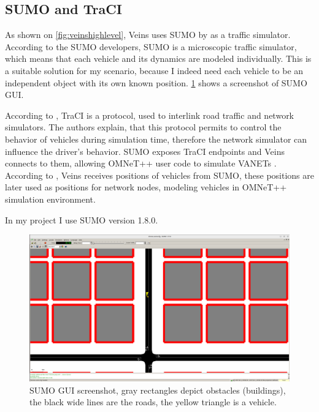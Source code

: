\documentclass[]{nsm-thesis}
\begin{document}
\subsection{SUMO and TraCI}
As shown on \cref{fig:veinshighlevel}, Veins uses SUMO by \textcite[Page~218]{sumo2018} as a traffic simulator. According to the SUMO developers, SUMO is a microscopic traffic simulator, which means that each vehicle and its dynamics are modeled individually.
This is a suitable solution for my scenario, because I indeed need each vehicle to be an independent object with its own known position. \cref{fig:sumogui} shows a screenshot of SUMO \ac{GUI}.

According to \textcite{traci}, \ac{TraCI} is a protocol, used to interlink road traffic and network simulators. The authors explain, that this protocol permits to control the behavior of vehicles during simulation time, therefore the network simulator can influence the driver's behavior. SUMO exposes \ac{TraCI} endpoints \cite{sumotraci} and Veins connects to them, allowing OMNeT++ user code to simulate \acp{VANET} \cite[Pages~217-218]{Sommer2019}. According to \textcite{Sommer2019}, Veins receives positions of vehicles from SUMO, these positions are later used as positions for network nodes, modeling vehicles in OMNeT++ simulation environment.

In my project I use SUMO version 1.8.0.

\begin{figure}
	\centering
	\includegraphics[width=1\textwidth]{figures/SUMO-GUI.png}
	\caption{SUMO \ac{GUI} screenshot, gray rectangles depict obstacles (buildings), the black wide lines are the roads, the yellow triangle is a vehicle.}
	\label{fig:sumogui}
\end{figure}
\end{document}
